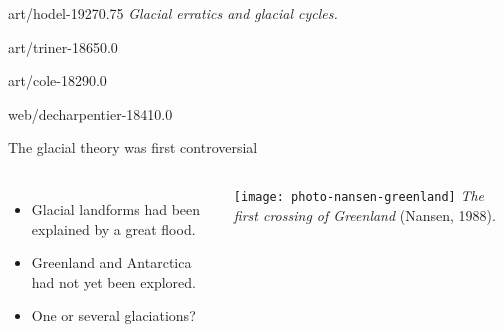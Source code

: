 \documentclass[aspectratio=1610]{beamer}
\begin{document}
    \begin{sectionframe}{art/hodel-1927}{0.75}{\insertsectionhead}
      \emph{Glacial erratics and glacial cycles.}
    \end{sectionframe}

    \begin{backgroundframe}[t]{art/triner-1865}{0.0}{}
      \flushleft{}
    \end{backgroundframe}

    \begin{backgroundframe}[t]{art/cole-1829}{0.0}{}
      \flushleft{}
    \end{backgroundframe}

    \begin{backgroundframe}[b]{web/decharpentier-1841}{0.0}{}
      \flushleft{}
    \end{backgroundframe}

    \begin{frame}{The glacial theory was first controversial}
      \begin{columns}
        \column{60mm}
          \begin{itemize}[<+->]
            \item Glacial landforms had been explained by a great flood.
            \bigskip
            \item Greenland and Antarctica had not yet been explored.
            \bigskip
            \item One or several glaciations?
          \end{itemize}
          \texttt{[image: photo-nansen-greenland]}  %
          \emph{The first crossing of Greenland} (Nansen, 1988).
      \end{columns}
    \end{frame}
\end{document}
